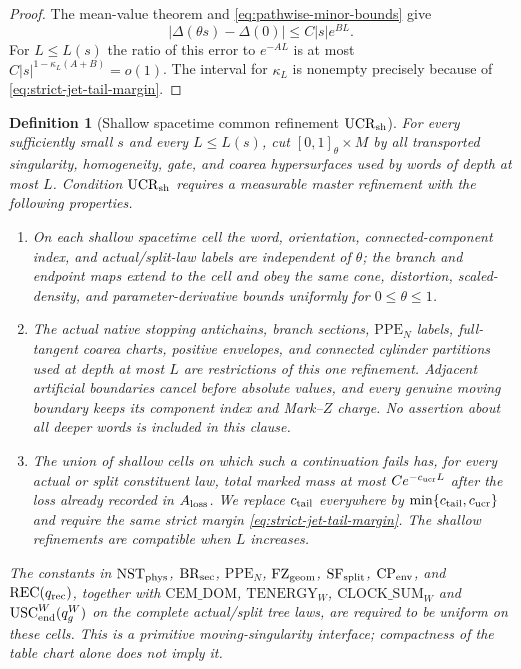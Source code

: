 \documentclass[11pt]{article}
\newtheorem{definition}[theorem]{Definition}
\begin{document}
\begin{proof}
The mean-value theorem and \eqref{eq:pathwise-minor-bounds} give
\[
 |\Delta(\theta s)-\Delta(0)|\le C|s|e^{BL}.
\]
For $L\le L(s)$ the ratio of this error to $e^{-AL}$ is at most
$C|s|^{1-\kappa_L(A+B)}=o(1)$.  The interval for $\kappa_L$ is nonempty precisely
because of \eqref{eq:strict-jet-tail-margin}.
\end{proof}

\begin{definition}[Shallow spacetime common refinement
$\mathrm{UCR}_{\rm sh}$]
\label{def:spacetime-common-refinement}
For every sufficiently small $s$ and every $L\le L(s)$, cut
$[0,1]_\theta\times M$ by all transported singularity, homogeneity, gate,
and coarea hypersurfaces used by words of depth at most $L$.  Condition
$\mathrm{UCR}_{\rm sh}$ requires a measurable master refinement with the
following properties.
\begin{enumerate}[label=\textup{(UCR\arabic*)}]
\item On each shallow spacetime cell the word, orientation,
      connected-component index, and actual/split-law labels are independent
      of $\theta$; the branch and endpoint maps extend to the cell and obey
      the same cone, distortion, scaled-density, and parameter-derivative
      bounds uniformly for $0\le\theta\le1$.
\item The actual native stopping antichains, branch sections,
      $\mathrm{PPE}_{N}$ labels, full-tangent
      coarea charts, positive envelopes, and connected cylinder partitions
      used at depth at most $L$ are restrictions of this one refinement.
      Adjacent artificial boundaries cancel before absolute values, and every
      genuine moving boundary keeps its component index and Mark--$Z$ charge.
      No assertion about all deeper words is included in this clause.
\item The union of shallow cells on which such a continuation fails has, for
      every actual or split constituent law, total marked mass at most
      $Ce^{-c_{\rm ucr}L}$ after the loss already recorded in
      $A_{\rm loss}$.  We replace $c_{\rm tail}$ everywhere by
      $\min\{c_{\rm tail},c_{\rm ucr}\}$ and require the same strict margin
      \eqref{eq:strict-jet-tail-margin}.  The shallow refinements are
      compatible when $L$ increases.
\end{enumerate}
The constants in $\mathrm{NST}_{\rm phys}$,
$\mathrm{BR}_{\rm sec}$, $\mathrm{PPE}_{N}$, $\mathrm{FZ}_{\rm geom}$,
$\mathrm{SF}_{\rm split}$, $\mathrm{CP}_{\rm env}$, and
$\mathrm{REC}(q_{\rm rec})$, together with
$\mathrm{CEM\_DOM}$, $\mathrm{TENERGY}_{W}$,
$\mathrm{CLOCK\_SUM}_{W}$ and
$\mathrm{USC}_{\rm end}^{W}(q_g^W)$ on the
complete actual/split tree laws, are required
to be uniform on these cells.
This is a primitive moving-singularity interface; compactness of the table
chart alone does not imply it.
\end{definition}
\end{document}
